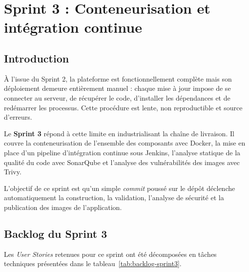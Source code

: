 \thispagestyle{fancy}

\chapter{Sprint 3 : Conteneurisation et intégration continue}

\newsavebox{\codebox}

\section*{Introduction}
À l'issue du Sprint 2, la plateforme est fonctionnellement complète mais son déploiement
demeure entièrement manuel : chaque mise à jour impose de se connecter au serveur, de
récupérer le code, d'installer les dépendances et de redémarrer les processus. Cette
procédure est lente, non reproductible et source d'erreurs.

Le \textbf{Sprint 3} répond à cette limite en industrialisant la chaîne de livraison. Il
couvre la conteneurisation de l'ensemble des composants avec Docker, la mise en place
d'un pipeline d'intégration continue sous Jenkins, l'analyse statique de la qualité du
code avec SonarQube et l'analyse des vulnérabilités des images avec Trivy.

L'objectif de ce sprint est qu'un simple \textit{commit} poussé sur le dépôt déclenche
automatiquement la construction, la validation, l'analyse de sécurité et la publication
des images de l'application.

\section{Backlog du Sprint 3}
Les \textit{User Stories} retenues pour ce sprint ont été décomposées en tâches
techniques présentées dans le tableau~\ref{tab:backlog-sprint3}.

